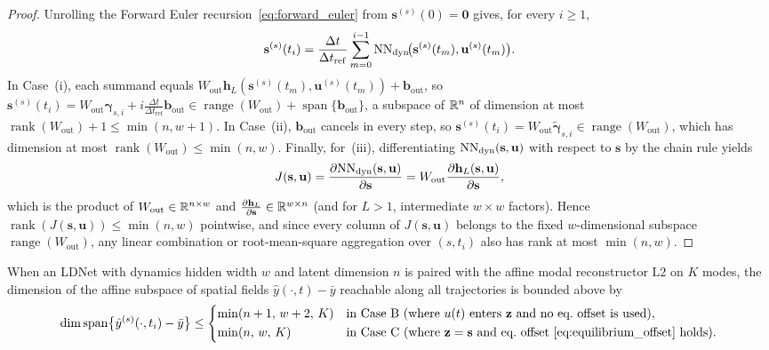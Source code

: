 \begin{proof}
Unrolling the Forward Euler recursion~\eqref{eq:forward_euler} from $\mathbf{s}^{(s)}(0) = \mathbf{0}$ gives, for every $i \ge 1$,
\[
  \mathbf{s}^{(s)}(t_i) = \frac{\Delta t}{\Delta t_{\mathrm{ref}}} \sum_{m=0}^{i-1} \mathrm{NN}_{\mathrm{dyn}}\!\big(\mathbf{s}^{(s)}(t_m), \mathbf{u}^{(s)}(t_m)\big).
\]
In Case~(i), each summand equals $W_{\mathrm{out}}\mathbf{h}_L(\mathbf{s}^{(s)}(t_m),\mathbf{u}^{(s)}(t_m)) + \mathbf{b}_{\mathrm{out}}$, so $\mathbf{s}^{(s)}(t_i) = W_{\mathrm{out}}\boldsymbol{\gamma}_{s,i} + i\frac{\Delta t}{\Delta t_{\mathrm{ref}}}\mathbf{b}_{\mathrm{out}} \in \operatorname{range}(W_{\mathrm{out}}) + \operatorname{span}\{\mathbf{b}_{\mathrm{out}}\}$, a subspace of $\mathbb{R}^n$ of dimension at most $\operatorname{rank}(W_{\mathrm{out}}) + 1 \le \min(n, w+1)$. In Case~(ii), $\mathbf{b}_{\mathrm{out}}$ cancels in every step, so $\mathbf{s}^{(s)}(t_i) = W_{\mathrm{out}}\widetilde{\boldsymbol{\gamma}}_{s,i} \in \operatorname{range}(W_{\mathrm{out}})$, which has dimension at most $\operatorname{rank}(W_{\mathrm{out}}) \le \min(n,w)$. Finally, for~(iii), differentiating $\mathrm{NN}_{\mathrm{dyn}}(\mathbf{s},\mathbf{u})$ with respect to $\mathbf{s}$ by the chain rule yields
\[
  J(\mathbf{s},\mathbf{u}) = \frac{\partial \mathrm{NN}_{\mathrm{dyn}}(\mathbf{s},\mathbf{u})}{\partial \mathbf{s}} = W_{\mathrm{out}} \frac{\partial \mathbf{h}_L(\mathbf{s},\mathbf{u})}{\partial \mathbf{s}},
\]
which is the product of $W_{\mathrm{out}} \in \mathbb{R}^{n \times w}$ and $\frac{\partial \mathbf{h}_L}{\partial \mathbf{s}} \in \mathbb{R}^{w \times n}$ (and for $L > 1$, intermediate $w \times w$ factors). Hence $\operatorname{rank}(J(\mathbf{s},\mathbf{u})) \le \min(n,w)$ pointwise, and since every column of $J(\mathbf{s},\mathbf{u})$ belongs to the fixed $w$-dimensional subspace $\operatorname{range}(W_{\mathrm{out}})$, any linear combination or root-mean-square aggregation over $(s,t_i)$ also has rank at most $\min(n,w)$.
\end{proof}

\begin{corollary}
\label{cor:combined_rank}
When an LDNet with dynamics hidden width $w$ and latent dimension $n$ is paired with the affine modal reconstructor $\mathrm{L2}$ on $K$ modes, the dimension of the affine subspace of spatial fields $\hat{y}(\cdot,t) - \bar{y}$ reachable along all trajectories is bounded above by
\begin{equation}
  \dim \operatorname{span}\!\big\{\hat{y}^{(s)}(\cdot,t_i) - \bar{y}\big\} \le \begin{dcases}
    \min(n + 1,\, w + 2,\, K) & \text{in Case B (where } u(t) \text{ enters } \mathbf{z}\text{ and no eq.\ offset is used)}, \\
    \min(n,\, w,\, K) & \text{in Case C (where } \mathbf{z}=\mathbf{s} \text{ and eq.\ offset~\eqref{eq:equilibrium_offset} holds)}.
  \end{dcases}
  \label{eq:combined_rank_bound}
\end{equation}
\end{corollary}

